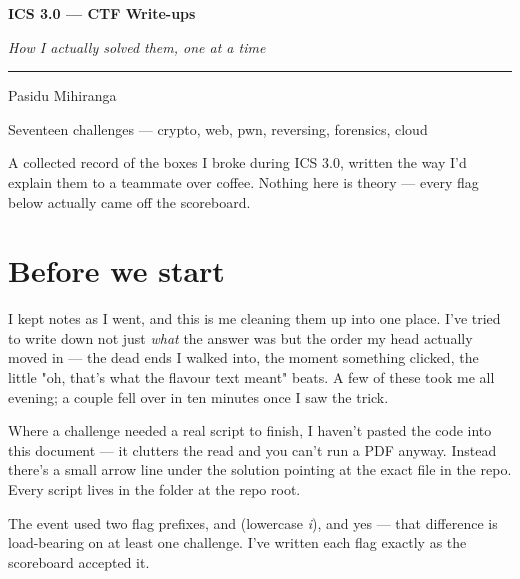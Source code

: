 \documentclass[11pt,a4paper]{article}
\newcommand{\code}[1]{\texttt{\detokenize{#1}}}
\begin{document}
\begin{titlepage}
\centering
\vspace*{3cm}
{\color{accent}\Huge\bfseries ICS 3.0 --- CTF Write-ups\par}
\vspace{0.6cm}
{\large\itshape How I actually solved them, one at a time\par}
\vspace{2cm}
\rule{0.5\linewidth}{0.6pt}\par
\vspace{1cm}
{\large Pasidu Mihiranga\par}
\vspace{0.3cm}
{\normalsize Seventeen challenges --- crypto, web, pwn, reversing, forensics, cloud\par}
\vfill
{\small A collected record of the boxes I broke during ICS 3.0, written the way
I'd explain them to a teammate over coffee. Nothing here is theory --- every
flag below actually came off the scoreboard.\par}
\vspace{2cm}
\end{titlepage}

\section*{Before we start}

I kept notes as I went, and this is me cleaning them up into one place. I've
tried to write down not just \emph{what} the answer was but the order my head
actually moved in --- the dead ends I walked into, the moment something clicked,
the little "oh, that's what the flavour text meant" beats. A few of these took
me all evening; a couple fell over in ten minutes once I saw the trick.

Where a challenge needed a real script to finish, I haven't pasted the code into
this document --- it clutters the read and you can't run a PDF anyway. Instead
there's a small arrow line under the solution pointing at the exact file in the
repo. Every script lives in the \code{scripts/} folder at the repo root.

The event used two flag prefixes, \code{ICS{}} and \code{iCS{}} (lowercase
\emph{i}), and yes --- that difference is load-bearing on at least one
challenge. I've written each flag exactly as the scoreboard accepted it.
\end{document}
